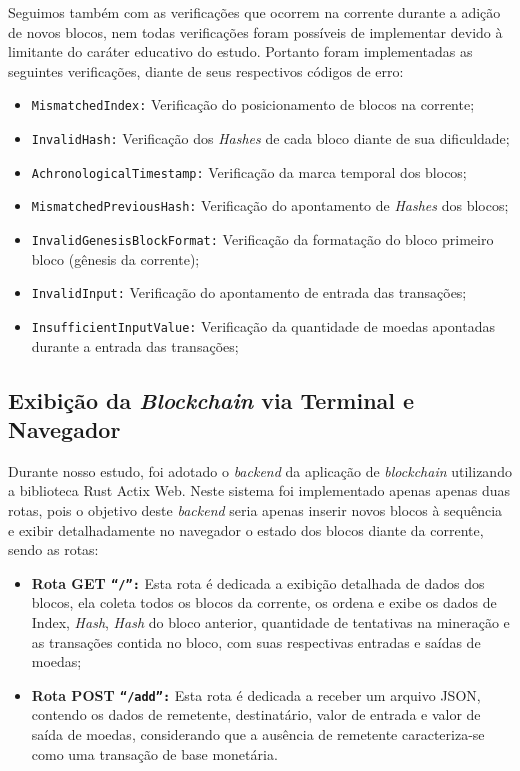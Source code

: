 \documentclass[article,12pt,oneside,a4paper,english,brazil]{unifil}
\begin{document}
\begin{Spacing}{1.5}
Seguimos também com as verificações que ocorrem na corrente durante a adição de novos blocos, nem todas verificações foram possíveis de implementar devido à limitante do caráter educativo do estudo. Portanto foram implementadas as seguintes verificações, diante de seus respectivos códigos de erro:

\begin{itemize}
    \item \texttt{MismatchedIndex:} Verificação do posicionamento de blocos na corrente;
    \item \texttt{InvalidHash:} Verificação dos \textit{Hashes} de cada bloco diante de sua dificuldade;
    \item \texttt{AchronologicalTimestamp:} Verificação da marca temporal dos blocos;
    \item \texttt{MismatchedPreviousHash:} Verificação do apontamento de \textit{Hashes} dos blocos;
    \item \texttt{InvalidGenesisBlockFormat:} Verificação da formatação do bloco primeiro bloco (gênesis da corrente);
    \item \texttt{InvalidInput:} Verificação do apontamento de entrada das transações;
    \item \texttt{InsufficientInputValue:} Verificação da quantidade de moedas apontadas durante a entrada das transações;

\end{itemize}

\subsection*{Exibição da \textit{Blockchain} via Terminal e Navegador}

Durante nosso estudo, foi adotado o \textit{backend} da aplicação de \textit{blockchain} utilizando a biblioteca Rust Actix Web. Neste sistema foi implementado apenas apenas duas rotas, pois o objetivo deste \textit{backend} seria apenas inserir novos blocos à sequência e exibir detalhadamente no navegador o estado dos blocos diante da corrente, sendo as rotas:

\begin{itemize}
\item \textbf{Rota GET \texttt{``/'':}} Esta rota é dedicada a exibição detalhada de dados dos blocos, ela coleta todos os blocos da corrente, os ordena e exibe os dados de Index, \textit{Hash}, \textit{Hash} do bloco anterior, quantidade de tentativas na mineração e as transações contida no bloco, com suas respectivas entradas e saídas de moedas;
\item \textbf{Rota POST \texttt{``/add'':}} Esta rota é dedicada a receber um arquivo JSON, contendo os dados de remetente, destinatário, valor de entrada e valor de saída de moedas, considerando que a ausência de remetente caracteriza-se como uma transação de base monetária.


\end{itemize}
\end{Spacing}
\end{document}
